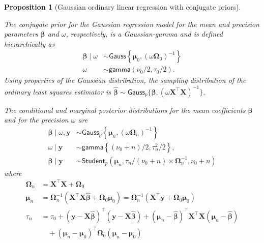 \documentclass[
  11pt,
  letterpaper,
]{scrbook}
\theoremstyle{definition}
\theoremstyle{definition}
\theoremstyle{definition}
\theoremstyle{plain}
\newtheorem{proposition}{Proposition}[chapter]
\theoremstyle{plain}
\theoremstyle{plain}
\theoremstyle{remark}
\begin{document}
\begin{proposition}[Gaussian ordinary linear regression with conjugate
priors]\protect\hypertarget{prp-gaussian-ols}{}\label{prp-gaussian-ols}

The conjugate prior for the Gaussian regression model for the mean and
precision parameters \(\boldsymbol{\beta}\) and \(\omega\),
respectively, is a Gaussian-gamma and is defined hierarchically as
\begin{align*}
\boldsymbol{\beta} \mid \omega &\sim \mathsf{Gauss}\left\{\boldsymbol{\mu}_0, (
\omega\boldsymbol{\Omega}_0)^{-1}\right\} \\
\omega &\sim \mathsf{gamma}(\nu_0/2,\tau_0/2).
\end{align*} Using properties of the Gaussian distribution, the sampling
distribution of the ordinary least squares estimator is
\(\widehat{\boldsymbol{\beta}} \sim \mathsf{Gauss}_p\{\boldsymbol{\beta}, (\omega\mathbf{X}^\top\mathbf{X})^{-1}\}\).

The conditional and marginal posterior distributions for the mean
coefficients \(\boldsymbol{\beta}\) and for the precision \(\omega\) are
\begin{align*}
\boldsymbol{\beta} \mid \omega, \boldsymbol{y} &\sim \mathsf{Gauss}_p\left\{\boldsymbol{\mu}_n, (\omega\boldsymbol{\Omega}_n)^{-1}\right\}  \\
\omega \mid  \boldsymbol{y} &\sim \mathsf{gamma}\left\{(\nu_0 + n)/2,  \tau^2_n/2\right\}, \\
\boldsymbol{\beta} \mid  \boldsymbol{y} &\sim \mathsf{Student}_p(\boldsymbol{\mu}_n,  \tau_n/(\nu_0+n) \times \mathbf{\Omega}_n^{-1}, \nu_0 + n)
\end{align*} where \begin{align*}
\boldsymbol{\Omega}_n &= \mathbf{X}^\top\mathbf{X} + \boldsymbol{\Omega}_0\\
\boldsymbol{\mu}_n &= \boldsymbol{\Omega}_n^{-1}(\mathbf{X}^\top\mathbf{X}\widehat{\boldsymbol{\beta}} + \boldsymbol{\Omega}_0\boldsymbol{\mu}_0) = \boldsymbol{\Omega}_n^{-1}(\mathbf{X}^\top\boldsymbol{y} + \boldsymbol{\Omega}_0\boldsymbol{\mu}_0)\\
\tau_n &= \tau_0 + (\boldsymbol{y} - \mathbf{X}\widehat{\boldsymbol{\beta}})^\top(\boldsymbol{y} - \mathbf{X}\widehat{\boldsymbol{\beta}}) + (\boldsymbol{\mu}_n - \widehat{\boldsymbol{\beta}})^\top \mathbf{X}^\top\mathbf{X}(\boldsymbol{\mu}_n - \widehat{\boldsymbol{\beta}}) \\& \quad + (\boldsymbol{\mu}_n-\boldsymbol{\mu}_0)^\top\boldsymbol{\Omega}_0(\boldsymbol{\mu}_n-\boldsymbol{\mu}_0)
\end{align*}

\end{proposition}
\end{document}
